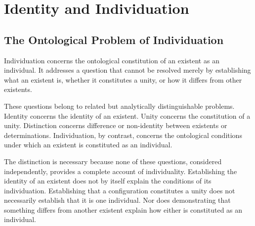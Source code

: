 %
%
%
%

\section{Identity and Individuation}
\label{sec:identity-and-individuation}

\subsection{The Ontological Problem of Individuation}

Individuation concerns the ontological constitution of an existent
as an individual. It addresses a question that cannot be resolved
merely by establishing what an existent is, whether it constitutes
a unity, or how it differs from other existents.

These questions belong to related but analytically distinguishable
problems. Identity concerns the identity of an existent. Unity
concerns the constitution of a unity. Distinction concerns
difference or non-identity between existents or determinations.
Individuation, by contrast, concerns the ontological conditions
under which an existent is constituted as an individual.

The distinction is necessary because none of these questions,
considered independently, provides a complete account of
individuality. Establishing the identity of an existent does not
by itself explain the conditions of its individuation. Establishing
that a configuration constitutes a unity does not necessarily
establish that it is one individual. Nor does demonstrating that
something differs from another existent explain how either is
constituted as an individual.

